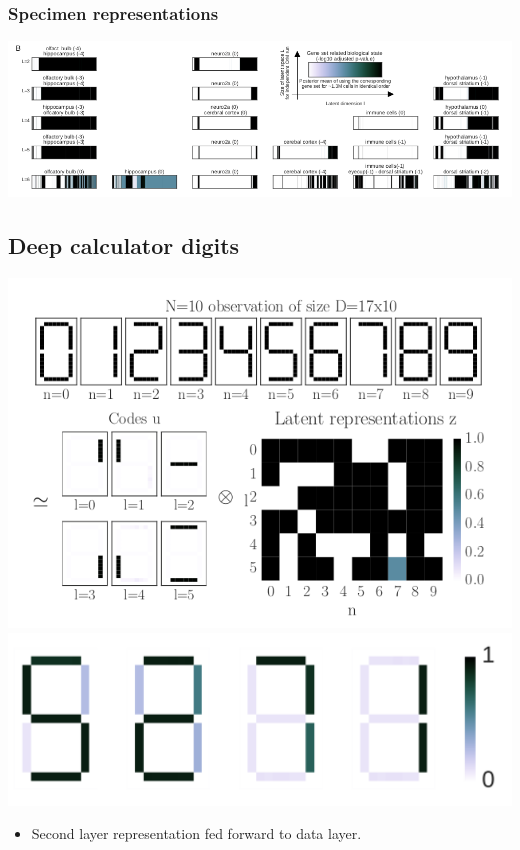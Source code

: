 \documentclass[11pt]{article}
\begin{document}
\subsubsection*{Specimen representations}
\label{sec-4-6-2}
\includegraphics[width=.9\linewidth]{./mice_neurons2.png}
\subsection*{Deep calculator digits}
\label{sec-4-7}
\includegraphics[width=.9\linewidth]{./calc_digit_intro.png}
\includegraphics[width=.9\linewidth]{./deep_calc.png}
\begin{itemize}
\item Second layer representation fed forward to data layer.
\end{itemize}
\end{document}
